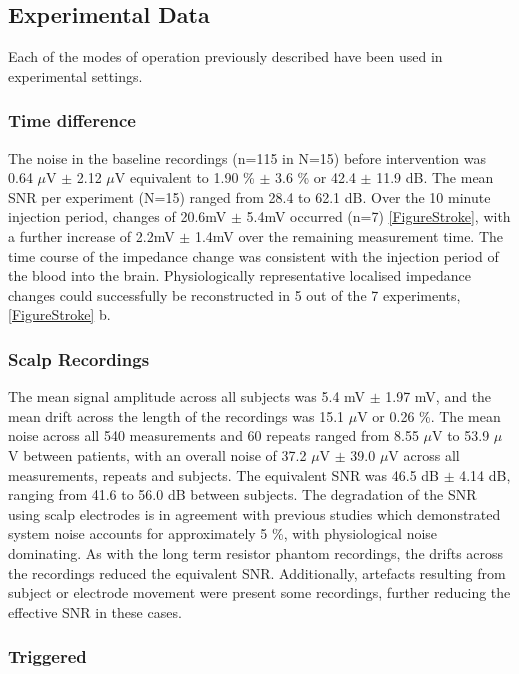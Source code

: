 \subsection{Experimental Data}

Each of the modes of operation previously described have been used in experimental settings. 

\subsubsection{Time difference}
The noise in the baseline recordings (n=115 in N=15) before intervention was 0.64 $\mu$V $\pm$ 2.12 $\mu$V equivalent to 1.90 \% $\pm$ 3.6 \% or 42.4 $\pm$ 11.9 dB. The mean SNR per experiment (N=15) ranged from 28.4 to 62.1 dB. Over the 10 minute injection period, changes of 20.6mV \(\pm\) 5.4mV occurred (n=7) \ref{FigureStroke}, with a further increase of 2.2mV \(\pm\) 1.4mV over the remaining measurement time. The time course of the impedance change was consistent with the injection period of the blood into the brain. Physiologically representative localised impedance changes could successfully be reconstructed in 5 out of the 7 experiments, \ref{FigureStroke} b. 


\subsubsection{Scalp Recordings}
The mean signal amplitude across all subjects was 5.4 mV $\pm$ 1.97 mV, and the mean drift across the length of the recordings was 15.1 $\mu$V or 0.26 \%. The mean noise across all 540 measurements and 60 repeats ranged from 8.55 $\mu$V to 53.9 $\mu$V between patients, with an overall noise of 37.2  $\mu$V $\pm$ 39.0 $\mu$V across all measurements, repeats and subjects. The equivalent SNR was 46.5 dB $\pm$ 4.14 dB, ranging from 41.6 to 56.0 dB between subjects. The degradation of the SNR using scalp electrodes is in agreement with previous studies \cite{fabrizi2007analysis} which demonstrated system noise accounts for approximately 5 \%, with physiological noise dominating. As with the long term resistor phantom recordings, the drifts across the recordings reduced the equivalent SNR. Additionally, artefacts resulting from subject or electrode movement were present some recordings, further reducing the effective SNR in these cases.  

\subsubsection{Triggered}

